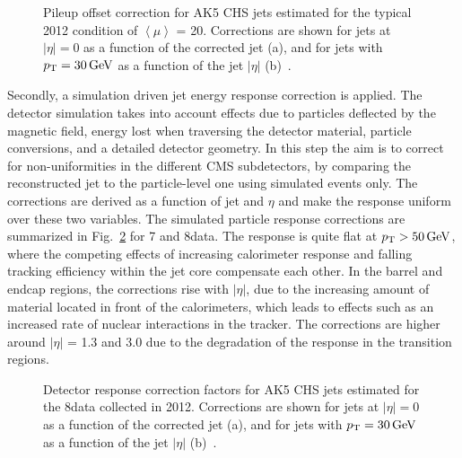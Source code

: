 \begin{figure}[!htb]
\centering
{}
\caption{Pileup offset correction for AK5 CHS jets estimated for the typical 2012 condition of $\left\langle\mu\right\rangle$ = 20. Corrections are shown for jets at $|\eta| = 0$ as a function of the corrected jet \pt (a), and for jets with $p_{\mathrm{T}} = 30\,\text{Ge\hspace{-.08em}V}$ as a function of the jet $|\eta|$ (b)~\cite{Khachatryan:2016kdb}.}
\label{fig:pucorr_ak5chs}
\end{figure}

Secondly, a simulation driven jet energy response correction is applied. The detector simulation takes into account effects due to particles deflected by the magnetic field, energy lost when traversing the detector material, particle conversions, and a detailed detector geometry. In this step the aim is to correct for non-uniformities in the different CMS subdetectors, by comparing the reconstructed jet \pt to the particle-level one using simulated events only. The corrections are derived as a function of jet \pt and $\eta$ and make the response uniform over these two variables. The simulated particle response corrections are summarized in Fig.~\ref{fig:MCcorr_ak5chs} for 7 and 8\TeV data. The response is quite flat at $p_{\mathrm{T}} > 50\,\text{Ge\hspace{-.08em}V}$, where the competing effects of increasing calorimeter response and falling tracking efficiency within the jet core compensate each other. In the barrel and endcap regions, the corrections rise with $|\eta|$, due to the increasing amount of material located in front of the calorimeters, which leads to effects such as an increased rate of nuclear interactions in the tracker. The corrections are higher around $|\eta|$ = 1.3 and 3.0 due to the degradation of the response in the transition regions.

\begin{figure}[!htb]
\centering
{}
\caption{Detector response correction factors for AK5 CHS jets estimated for the 8\TeV data collected in 2012. Corrections are shown for jets at $|\eta| = 0$ as a function of the corrected jet \pt (a), and for jets with $p_{\mathrm{T}} = 30\,\text{Ge\hspace{-.08em}V}$ as a function of the jet $|\eta|$ (b)~\cite{Khachatryan:2016kdb}.}
\label{fig:MCcorr_ak5chs}
\end{figure}

